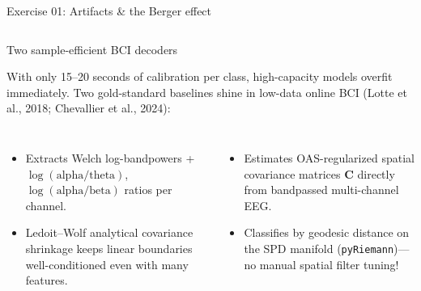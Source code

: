 \documentclass[aspectratio=169,11pt,t]{beamer}
\begin{document}
\begin{frame}{Exercise 01: Artifacts \& the Berger effect}
  \vspace{2mm}
  \begin{columns}[T,onlytextwidth]
  \end{columns}
\end{frame}


\begin{frame}{Two sample-efficient BCI decoders}
  {\NTXSans\small\color{NTXMuted}With only 15--20 seconds of calibration per class, high-capacity models overfit immediately. Two gold-standard baselines shine in low-data online BCI (Lotte et al., 2018; Chevallier et al., 2024):\par}
  \vspace{3mm}
  \begin{columns}[T,onlytextwidth]
      \begin{itemize}\scriptsize\color{NTXInk}
        \item Extracts Welch log-bandpowers + $\log(\mathrm{alpha/theta})$, $\log(\mathrm{alpha/beta})$ ratios per channel.
        \item Ledoit--Wolf analytical covariance shrinkage keeps linear boundaries well-conditioned even with many features.
      \end{itemize}
      \begin{itemize}\scriptsize\color{NTXInk}
        \item Estimates OAS-regularized spatial covariance matrices $\mathbf{C}$ directly from bandpassed multi-channel EEG.
        \item Classifies by geodesic distance on the SPD manifold (\texttt{pyRiemann})---no manual spatial filter tuning!
      \end{itemize}
  \end{columns}
\end{frame}
\end{document}
